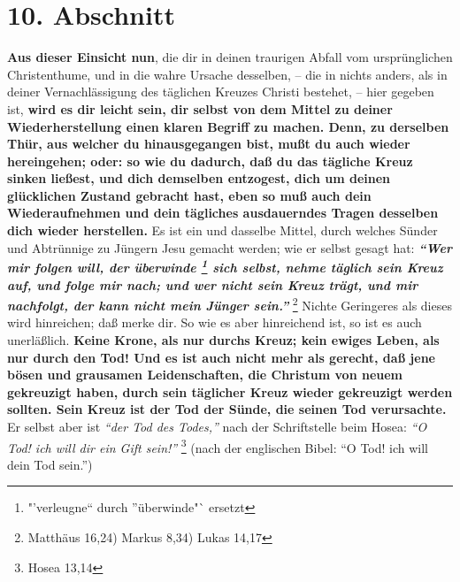 \section{10. Abschnitt}  \label{kap2_ab10}

\textbf{Aus dieser Einsicht nun}, die dir in deinen traurigen Abfall vom
ursprünglichen
Christenthume, und in die wahre Ursache desselben, -- die in nichts anders, als
in deiner Vernachlässigung des täglichen Kreuzes Christi bestehet, -- hier
gegeben ist, \textbf{wird es dir leicht sein, dir selbst von dem Mittel zu
deiner
Wiederherstellung einen klaren Begriff zu machen. Denn, zu derselben Thür, aus
welcher du hinausgegangen bist, mußt du auch wieder hereingehen; oder: so wie du
dadurch, daß du das tägliche Kreuz sinken ließest, und dich demselben entzogest,
dich um deinen glücklichen Zustand gebracht hast, eben so muß auch dein
Wiederaufnehmen und dein tägliches ausdauerndes Tragen desselben dich wieder
herstellen.} Es ist ein und dasselbe Mittel, durch welches Sünder und Abtrünnige
zu Jüngern Jesu gemacht werden; wie er selbst gesagt hat:
\textbf{\textit{"`Wer mir
folgen will, der überwinde \footnote{"'verleugne"` durch "'überwinde"` ersetzt}
sich selbst, nehme täglich sein Kreuz auf, und folge
mir nach; und wer nicht sein Kreuz trägt, und mir nachfolgt, der kann nicht mein
Jünger sein."'}}
\footnote{Matthäus 16,24) Markus 8,34) Lukas 14,17}
 Nichte
Geringeres als dieses wird hinreichen; daß merke dir. So wie es aber hinreichend
ist, so ist es auch unerläßlich. \textbf{Keine Krone, als nur durchs Kreuz;
kein ewiges Leben, als nur durch den Tod!
Und es ist auch nicht mehr als gerecht, daß jene
bösen und grausamen Leidenschaften, die Christum von neuem gekreuzigt haben,
durch sein täglicher Kreuz wieder gekreuzigt werden sollten. Sein Kreuz ist der
Tod der Sünde, die seinen Tod verursachte.} Er selbst aber ist
\textit{"`der Tod des Todes,"'} nach der Schriftstelle beim Hosea:
\textit{"`O Tod! ich will dir ein Gift sein!"'}
\footnote{Hosea 13,14}
 (nach der englischen Bibel: "`O Tod! ich will
dein
Tod sein."')


